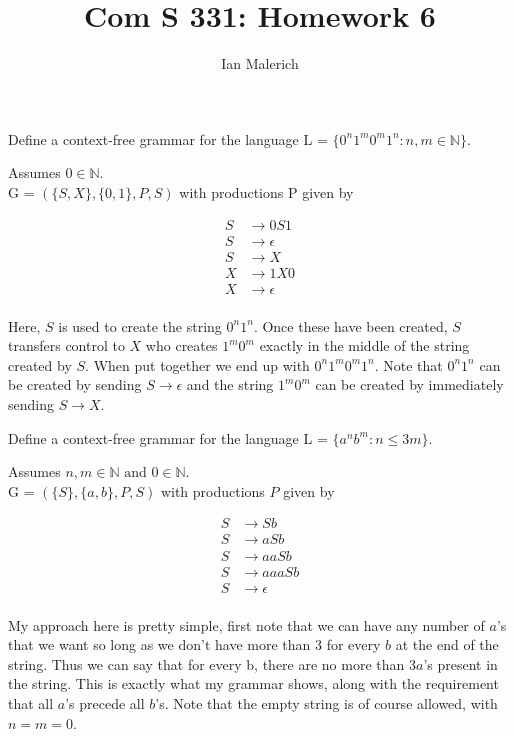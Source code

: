 \documentclass[12pt]{jhwhw}
\author{Ian Malerich}
\title{Com S 331: Homework 6}
\begin{document}
\raggedright

\problem{}

	Define a context-free grammar for the language L = $\{0^n1^m0^m1^n: n,m\in \mathbb{N}\}$.

\solution

	Assumes $0\in \mathbb{N}$. \\
	G = $(\{S, X\}, \{0,1\}, P, S)$ with productions P given by

	\begin{align*}
		S &\rightarrow 0S1 \\
		S &\rightarrow \epsilon  \\
		S &\rightarrow X \\
		X &\rightarrow 1X0 \\
		X &\rightarrow \epsilon \\
	\end{align*}

	Here, $S$ is used to create the string $0^n1^n$. Once these have been created,
	$S$ transfers control to $X$ who creates $1^m0^m$ exactly in the middle of the
	string created by $S$. When put together we end up with $0^n1^m0^m1^n$.
	Note that $0^n1^n$ can be created by sending $S\rightarrow\epsilon$ and the string
	$1^m0^m$ can be created by immediately sending $S\rightarrow X$.

\problem{}

	Define a context-free grammar for the language L = $\{a^nb^m: n\leq 3m\}$.

\solution

	Assumes $n,m\in \mathbb{N} \text{ and } 0\in \mathbb{N}$.  \\
	G = $(\{S\}, \{a,b\}, P, S)$ with productions $P$ given by

	\begin{align*}
		S &\rightarrow Sb \\
		S &\rightarrow aSb \\
		S &\rightarrow aaSb\\
		S &\rightarrow aaaSb\\
		S &\rightarrow \epsilon \\
	\end{align*}

	My approach here is pretty simple, first note that we can have any number of $a$'s that 
	we want so long as we don't have more than 3 for every $b$ at the end of the string.
	Thus we can say that for every b, there are no more than 3$a$'s present in the string.
	This is exactly what my grammar shows, along with the requirement that all $a$'s precede
	all $b$'s. Note that the empty string is of course allowed,
	with $n=m=0$.
\end{document}
